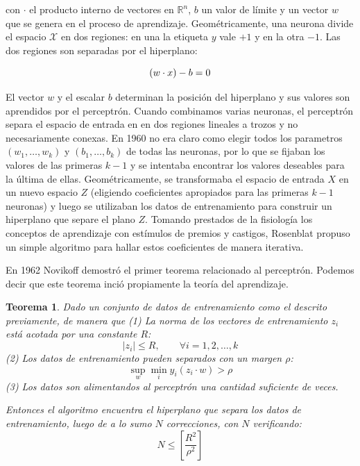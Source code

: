\documentclass{report}
\newtheorem{thm}{Teorema}[section]
\begin{document}
con \(\cdot\) el producto interno de vectores en \(\mathbb{R}^n\), \(b\) un valor de límite y un vector \(w\) que se genera en el proceso de aprendizaje. Geométricamente, una 
neurona divide el espacio \(\mathcal{X}\) en dos regiones: en una la etiqueta \(y\) vale \(+1\) y en la otra \(-1\). Las dos regiones son separadas por el hiperplano:\newline

\[
(w\cdot x) - b = 0 \newline
\]

El vector \(w\) y el escalar \(b\) determinan la posición del hiperplano y sus valores son aprendidos por el perceptrón. Cuando combinamos varias neuronas, el perceptrón
separa el espacio de entrada en en dos regiones lineales a trozos y no necesariamente conexas. En 1960 no era claro como elegir todos los parametros \((w_1,\dots,w_k)\) y
\((b_1,\dots, b_k)\) de todas las neuronas, por lo que se fijaban los valores de las primeras \(k-1\) y se intentaba encontrar los valores deseables para la última
de ellas. Geométricamente, se transformaba el espacio de entrada $X$ en un nuevo espacio $Z$ (eligiendo coeficientes apropiados para las primeras $k-1$ neuronas) y luego
se utilizaban los datos de entrenamiento para construir un hiperplano que separe el plano $Z$. Tomando prestados de la fisiología los conceptos de aprendizaje con estímulos de premios y castigos, Rosenblat propuso un simple algoritmo para hallar estos 
coeficientes de manera iterativa.\newline


En 1962 Novikoff demostró el primer teorema relacionado al perceptrón. Podemos decir que este teorema inció propiamente la teoría del aprendizaje.

\begin{thm}
Dado un conjunto de datos de entrenamiento como el descrito previamente, de manera que\newline
(1) La norma de los vectores de entrenamiento $z_i$ está acotada por una constante $R$:
\[
|z_i| \leq R, \qquad \forall i=1,2,\dots,k
\]
(2) Los datos de entrenamiento pueden separados con un margen $\rho$:
\[
\sup_{w} \min_{i} y_i(z_i\cdot w) > \rho
\]
(3) Los datos son alimentandos al perceptrón una cantidad \textit{suficiente} de veces.

Entonces el algoritmo encuentra el hiperplano que separa los datos de entrenamiento, luego de a lo
sumo $N$ correcciones, con $N$ verificando:
\[
N \leq \left [ \frac{R^2}{\rho^2}\right ]
\]

\end{thm}
\end{document}

